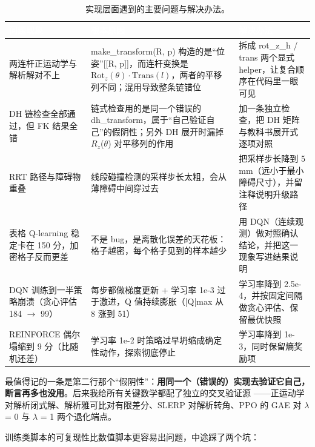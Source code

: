 \documentclass[11pt,a4paper]{ctexart}
\newcommand{\hTwo}[1]{\par\vspace{0.8em}{\color{hmid}\large\bfseries #1}\par\vspace{0.25em}}
\begin{document}
\begin{table}[htbp]
\centering
\begin{tabularx}{\textwidth}{>{\hsize=0.7875\hsize\raggedright\arraybackslash}X>{\hsize=1.0500\hsize\raggedright\arraybackslash}X>{\hsize=1.1625\hsize\raggedright\arraybackslash}X}
\toprule
\rowcolor{thd}\textcolor{white}{\textbf{问题现象}} & \textcolor{white}{\textbf{根本原因}} & \textcolor{white}{\textbf{解决办法}} \\
\midrule
两连杆正运动学与解析解对不上 & make\_transform(R, p) 构造的是“位姿”[[R, p]]，而连杆变换是 $\mathrm{Rot}_z(\theta)\cdot\mathrm{Trans}(l)$，两者的平移列不同；混用导致整条链错位 & 拆成 rot\_z\_h / trans 两个显式 helper，让复合顺序在代码里一眼可见 \\
\rowcolor{tal}
DH 链检查全部通过，但 FK 结果全错 & 链式检查用的是同一个错误的 dh\_transform，属于“自己验证自己”的假阴性；另外 DH 展开时漏掉 $R_{z}$($\theta$) 对平移列的作用 & 加一条独立检查，把 DH 矩阵与教科书展开式逐项对照 \\
RRT 路径与障碍物重叠 & 线段碰撞检测的采样步长太粗，会从薄障碍中间穿过去 & 把采样步长降到 5 mm（远小于最小障碍尺寸），并留注释说明升级路径 \\
\rowcolor{tal}
表格 Q-learning 稳定卡在 150 分，加密格子反而更差 & 不是 bug，是离散化误差的天花板：格子越密，每个格子见到的样本越少 & 用 DQN（连续观测）做对照确认结论，并把这一现象写进结果说明 \\
DQN 训练到一半策略崩溃（贪心评估 184 $\rightarrow$ 99） & 每步都做梯度更新 + 学习率 1e-3 过于激进，Q 值持续膨胀（|Q|max 从 8 涨到 51） & 学习率降到 2.5e-4，并按固定间隔做贪心评估、保留最优快照 \\
\rowcolor{tal}
REINFORCE 偶尔塌缩到 9 分（比随机还差） & 学习率 1e-2 时策略过早坍缩成确定性动作，探索彻底停止 & 学习率降到 1e-3，同时保留熵奖励项 \\
\bottomrule
\end{tabularx}
\caption{实现层面遇到的主要问题与解决办法。}
\end{table}

最值得记的一条是第二行那个“假阴性”：\textbf{用同一个（错误的）实现去验证它自己，断言再多也没用}。后来我给所有关键数学都配了独立的交叉验证源 ——正运动学对解析闭式解、解析雅可比对有限差分、SLERP 对解析转角、PPO 的 GAE 对 $\lambda$ = 0 与 $\lambda$ = 1 两个退化端点。\par

\hTwo{5.2 实验可复现性}

训练类脚本的可复现性比数值脚本更容易出问题，中途踩了两个坑：\par
\end{document}
